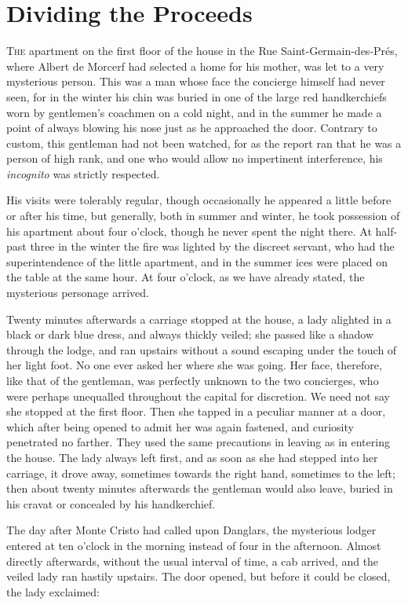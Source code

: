 \chapter{Dividing the Proceeds} 

 \lettrine{T}{he} apartment on the first floor of the house in the Rue Saint-Germain-des-Prés, where Albert de Morcerf had selected a home for his mother, was let to a very mysterious person. This was a man whose face the concierge himself had never seen, for in the winter his chin was buried in one of the large red handkerchiefs worn by gentlemen's coachmen on a cold night, and in the summer he made a point of always blowing his nose just as he approached the door. Contrary to custom, this gentleman had not been watched, for as the report ran that he was a person of high rank, and one who would allow no impertinent interference, his \textit{incognito} was strictly respected. 

 His visits were tolerably regular, though occasionally he appeared a little before or after his time, but generally, both in summer and winter, he took possession of his apartment about four o'clock, though he never spent the night there. At half-past three in the winter the fire was lighted by the discreet servant, who had the superintendence of the little apartment, and in the summer ices were placed on the table at the same hour. At four o'clock, as we have already stated, the mysterious personage arrived. 

 Twenty minutes afterwards a carriage stopped at the house, a lady alighted in a black or dark blue dress, and always thickly veiled; she passed like a shadow through the lodge, and ran upstairs without a sound escaping under the touch of her light foot. No one ever asked her where she was going. Her face, therefore, like that of the gentleman, was perfectly unknown to the two concierges, who were perhaps unequalled throughout the capital for discretion. We need not say she stopped at the first floor. Then she tapped in a peculiar manner at a door, which after being opened to admit her was again fastened, and curiosity penetrated no farther. They used the same precautions in leaving as in entering the house. The lady always left first, and as soon as she had stepped into her carriage, it drove away, sometimes towards the right hand, sometimes to the left; then about twenty minutes afterwards the gentleman would also leave, buried in his cravat or concealed by his handkerchief. 

 The day after Monte Cristo had called upon Danglars, the mysterious lodger entered at ten o'clock in the morning instead of four in the afternoon. Almost directly afterwards, without the usual interval of time, a cab arrived, and the veiled lady ran hastily upstairs. The door opened, but before it could be closed, the lady exclaimed: 

